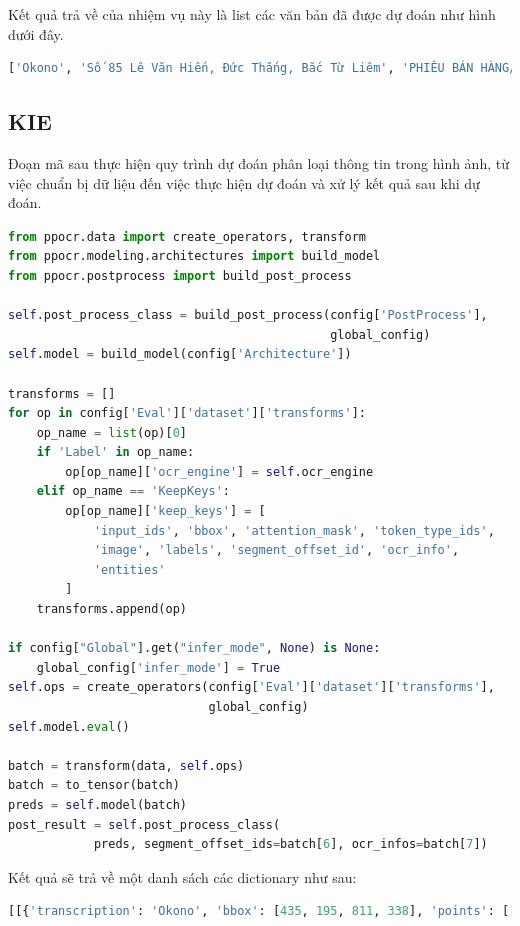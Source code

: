 Kết quả trả về của nhiệm vụ này là list các văn bản đã được dự đoán như hình dưới đây.
\begin{lstlisting}[language=Python]
['Okono', 'Số 85 Lê Văn Hiến, Đức Thắng, Bắc Từ Liêm', 'PHIÊU BÁN HÀNG/ INVOICE', 'Số:A3 1AA145550Ngày:18/05/2023 7:51:19PM', ...]
\end{lstlisting}
\subsection{KIE}
Đoạn mã sau thực hiện quy trình dự đoán phân loại thông tin trong hình ảnh, từ việc chuẩn bị dữ liệu đến việc thực hiện dự đoán và xử lý kết quả sau khi dự đoán.
\begin{lstlisting}[language=Python]
from ppocr.data import create_operators, transform
from ppocr.modeling.architectures import build_model
from ppocr.postprocess import build_post_process

self.post_process_class = build_post_process(config['PostProcess'],
                                             global_config)
self.model = build_model(config['Architecture'])

transforms = []
for op in config['Eval']['dataset']['transforms']:
    op_name = list(op)[0]
    if 'Label' in op_name:
        op[op_name]['ocr_engine'] = self.ocr_engine
    elif op_name == 'KeepKeys':
        op[op_name]['keep_keys'] = [
            'input_ids', 'bbox', 'attention_mask', 'token_type_ids',
            'image', 'labels', 'segment_offset_id', 'ocr_info',
            'entities'
        ]
    transforms.append(op)

if config["Global"].get("infer_mode", None) is None:
    global_config['infer_mode'] = True
self.ops = create_operators(config['Eval']['dataset']['transforms'],
                            global_config)
self.model.eval()

batch = transform(data, self.ops)
batch = to_tensor(batch)
preds = self.model(batch)
post_result = self.post_process_class(
            preds, segment_offset_ids=batch[6], ocr_infos=batch[7])
\end{lstlisting}
Kết quả sẽ trả về một danh sách các dictionary như sau:
\begin{lstlisting}[language=Python]
[[{'transcription': 'Okono', 'bbox': [435, 195, 811, 338], 'points': [[437.0, 195.0], [811.0, 201.0], [808.0, 338.0], [435.0, 332.0]], 'pred_id': 1, 'pred': 'SELLER'}, {'transcription': 'Số 85 Lê Văn Hiến, Đức Thắng, Bắc Từ Liêm', 'bbox': [309, 390, 890, 426], 'points': [[309.0, 390.0], [890.0, 392.0], [890.0, 426.0], [309.0, 424.0]], 'pred_id': 3, 'pred': 'ADDRESS'},...]
\end{lstlisting}
